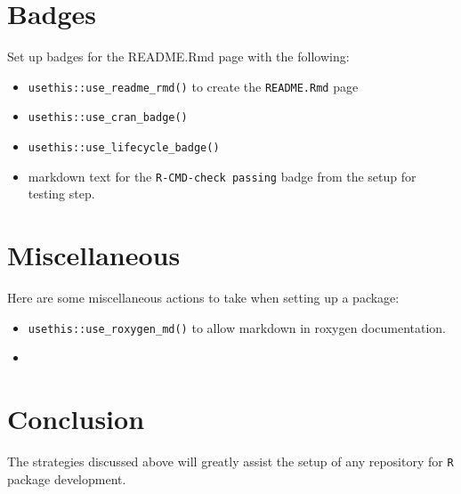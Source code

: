 \documentclass{article}
\begin{document}
\section{Badges}
\label{sec:badges}

Set up badges for the README.Rmd page with the following:

\begin{itemize}
	
  \item \verb|usethis::use_readme_rmd()| to create the \verb|README.Rmd| page

  \item \verb|usethis::use_cran_badge()|

  \item \verb|usethis::use_lifecycle_badge()|
  
  \item markdown text for the \verb|R-CMD-check passing| badge from the setup for testing step.

\end{itemize}


\section{Miscellaneous}
\label{sec:misc}

Here are some miscellaneous actions to take when setting up a package:

\begin{itemize}

  \item \verb|usethis::use_roxygen_md()| to allow markdown in roxygen documentation.

  \item

\end{itemize}
%



\section{Conclusion} 
\label{sec:conclusion}

The strategies discussed above will greatly assist the setup of any repository 
for \texttt{R} package development.




% 
\end{document}
